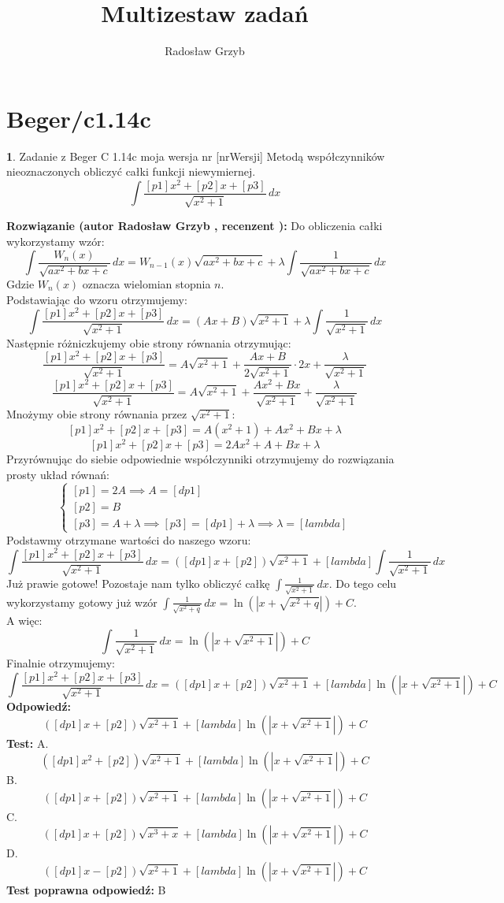\documentclass[12pt, a4paper]{article}
\title{Multizestaw zadań}
\author{Radosław Grzyb}
\date{}
\theoremstyle{definition} %
\newtheorem{zad}{}
\newcommand{\kategoria}[1]{\section{#1}} %
\newcommand{\zadStart}[1]{\begin{zad}#1\newline} %
\newcommand{\zadStop}{\end{zad}}   %
\newcommand{\rozwStart}[2]{\noindent \textbf{Rozwiązanie (autor #1 , recenzent #2): }\newline} %
\newcommand{\rozwStop}{\newline}                                            %
\newcommand{\odpStart}{\noindent \textbf{Odpowiedź:}\newline}    %
\newcommand{\odpStop}{\newline}                                             %
\newcommand{\testStart}{\noindent \textbf{Test:}\newline} %
\newcommand{\testStop}{\newline} %
\newcommand{\kluczStart}{\noindent \textbf{Test poprawna odpowiedź:}\newline} %
\newcommand{\kluczStop}{\newline} %
\begin{document}
\maketitle
\kategoria{Beger/c1.14c}
\zadStart{Zadanie z Beger C 1.14c moja wersja nr [nrWersji]}
Metodą współczynników nieoznaczonych obliczyć całki funkcji niewymiernej.
$$\int \frac{[p1]x^{2}+[p2]x+[p3]}{\sqrt{x^{2}+1}} \,dx$$
\zadStop
\rozwStart{Radosław Grzyb}{}
Do obliczenia całki wykorzystamy wzór:
$$\int \frac{W_n(x)}{\sqrt{ax^2+bx+c}} \,dx=W_{n-1}(x)\sqrt{ax^2+bx+c}+\lambda\int \frac{1}{\sqrt{ax^2+bx+c}} \,dx$$
Gdzie $W_n(x)$ oznacza wielomian stopnia $n$.\\
Podstawiając do wzoru otrzymujemy:
$$\int \frac{[p1]x^{2}+[p2]x+[p3]}{\sqrt{x^{2}+1}} \,dx=(Ax+B)\sqrt{x^{2}+1}+\lambda\int \frac{1}{\sqrt{x^{2}+1}} \,dx$$
Następnie różniczkujemy obie strony równania otrzymując:
$$\frac{[p1]x^{2}+[p2]x+[p3]}{\sqrt{x^{2}+1}}=A\sqrt{x^{2}+1}+\frac{Ax+B}{2\sqrt{x^2+1}}\cdot2x+ \frac{\lambda}{\sqrt{x^{2}+1}}$$
$$\frac{[p1]x^{2}+[p2]x+[p3]}{\sqrt{x^{2}+1}}=A\sqrt{x^{2}+1}+\frac{Ax^{2}+Bx}{\sqrt{x^2+1}}+ \frac{\lambda}{\sqrt{x^{2}+1}}$$
Mnożymy obie strony równania przez $\sqrt{x^{2}+1}$:
$$[p1]x^{2}+[p2]x+[p3]=A(x^{2}+1)+Ax^2+Bx+\lambda$$
$$[p1]x^{2}+[p2]x+[p3]=2Ax^{2}+A+Bx+\lambda$$
Przyrównując do siebie odpowiednie współczynniki otrzymujemy do rozwiązania prosty układ równań:
$$\begin{cases} [p1]=2A \implies A=[dp1] \\ [p2]=B \\ [p3]=A+\lambda \implies [p3]=[dp1]+\lambda \implies \lambda=[lambda] \end{cases}$$
Podstawmy otrzymane wartości do naszego wzoru:
$$\int \frac{[p1]x^{2}+[p2]x+[p3]}{\sqrt{x^{2}+1}} \,dx=([dp1]x+[p2])\sqrt{x^{2}+1}+[lambda]\int \frac{1}{\sqrt{x^{2}+1}} \,dx$$
Już prawie gotowe! Pozostaje nam tylko obliczyć całkę $\int \frac{1}{\sqrt{x^{2}+1}} \,dx$. Do tego celu wykorzystamy gotowy już wzór $\int \frac{1}{\sqrt{x^{2}+q}} \,dx = \ln(|x+\sqrt{x^2+q}|)+C$.\\
A więc:
$$\int \frac{1}{\sqrt{x^{2}+1}} \,dx= \ln(|x+\sqrt{x^2+1}|)+C$$
Finalnie otrzymujemy:
$$\int \frac{[p1]x^{2}+[p2]x+[p3]}{\sqrt{x^{2}+1}} \,dx=([dp1]x+[p2])\sqrt{x^{2}+1}+[lambda]\ln(|x+\sqrt{x^2+1}|)+C$$
\rozwStop
\odpStart
$$([dp1]x+[p2])\sqrt{x^{2}+1}+[lambda]\ln(|x+\sqrt{x^2+1}|)+C$$
\odpStop
\testStart
A.$$([dp1]x^{2}+[p2])\sqrt{x^{2}+1}+[lambda]\ln(|x+\sqrt{x^2+1}|)+C$$
B.$$([dp1]x+[p2])\sqrt{x^{2}+1}+[lambda]\ln(|x+\sqrt{x^2+1}|)+C$$
C.$$([dp1]x+[p2])\sqrt{x^{3}+x}+[lambda]\ln(|x+\sqrt{x^2+1}|)+C$$
D.$$([dp1]x-[p2])\sqrt{x^{2}+1}+[lambda]\ln(|x+\sqrt{x^2+1}|)+C$$
\testStop
\kluczStart
B
\kluczStop
\end{document}
